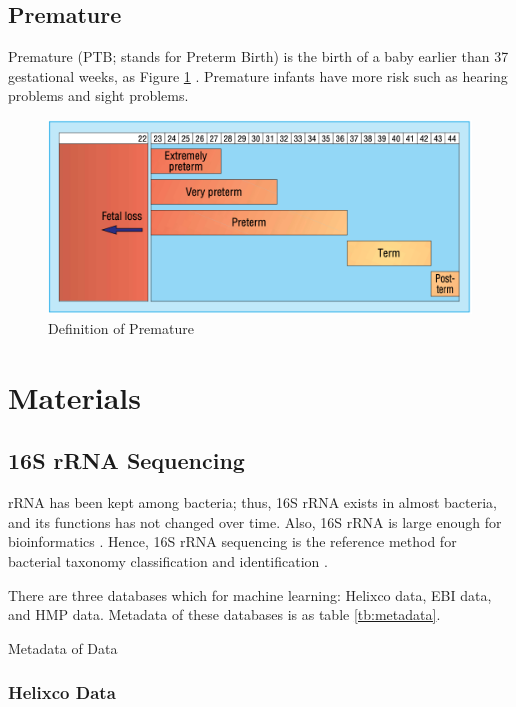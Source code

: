 \documentclass[a4paper]{article}
\begin{document}
        \subsection{Premature}
            Premature (PTB; stands for Preterm Birth) is the birth of a baby earlier than 37 gestational weeks, as Figure \ref{fig:ptb} \cite{premature1}. Premature infants have more risk such as hearing problems and sight problems.

            \begin{figure}[p]
                \centering
                \includegraphics[width=0.4 \linewidth]{figures/premature.png}
                \caption{Definition of Premature \protect \cite{premature1}}
                \label{fig:ptb}
            \end{figure}

    \section{Materials}
        \subsection{16S rRNA Sequencing}
            rRNA has been kept among bacteria; thus, 16S rRNA exists in almost bacteria, and its functions has not changed over time. Also, 16S rRNA is large enough for bioinformatics \cite{16S2}. Hence, 16S rRNA sequencing is the reference method for bacterial taxonomy classification and identification \cite{16S1}.

            There are three databases which for machine learning: Helixco data, EBI data, and HMP data. Metadata of these databases is as table \ref{tb:metadata}.

            \begin{table}[p]
                \centering
                \caption{Metadata of Data}
                \label{tb:metadata}
                
            \end{table}

            \subsubsection{Helixco Data}
\end{document}
